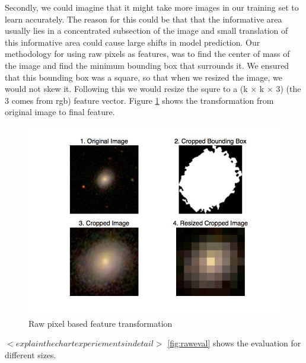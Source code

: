 \documentclass[10pt]{article}
\begin{document}
Secondly, we could imagine that it might take more images in our training set to learn accurately. The reason for this could be that that the informative area usually lies in a concentrated subsection of the image and small translation of this informative area could cause large shifts in model prediction.
Our methodology for using raw pixels as features, was to find the center of mass of the image and find the minimum bounding box that surrounds it. We ensured that this bounding box was a square, so that when we resized the image, we would not skew it. Following this we would resize the squre to a (k × k × 3) (the 3 comes from rgb) feature vector. Figure \ref{fig:raw} shows the transformation from original image to final feature.

\begin{figure}[h]
\begin{center}
\includegraphics[scale=0.4]{images/hand_engineered_features.jpg}
\caption{Raw pixel based feature transformation}
\end{center}
\label{fig:raw}
\end{figure}

$<explain the chart experiements in detail>$ \ref{fig:raweval} shows the evaluation for different sizes.
\end{document}
